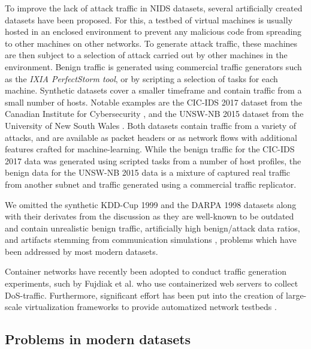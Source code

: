 \documentclass[sigconf]{acmart}
\begin{document}
To improve the lack of attack traffic in NIDS datasets, several artificially created datasets have been proposed. For this, a testbed of virtual machines is usually hosted in an enclosed environment to prevent any malicious code from spreading to other machines on other networks. To generate attack traffic, these machines are then subject to a selection of attack carried out by other machines in the environment. Benign traffic is generated using commercial traffic generators such as the \emph{IXIA PerfectStorm tool}, or by scripting a selection of tasks for each machine. Synthetic datasets cover a smaller timeframe and contain traffic from a small number of hosts. Notable examples are the CIC-IDS 2017 dataset from the Canadian Institute for Cybersecurity \cite{sharafaldin2018towards}, %
and the UNSW-NB 2015 dataset from the University of New South Wales \cite{moustafa_unsw-nb15:_2015}. Both datasets contain traffic from a variety of attacks, and are available as packet headers or as network flows with additional features crafted for machine-learning. While the benign traffic for the CIC-IDS 2017 data was generated using scripted tasks from a number of host profiles, the benign data for the UNSW-NB 2015 data is a mixture of captured real traffic from another subnet and traffic generated using a commercial traffic replicator. 


We omitted the synthetic KDD-Cup 1999 and the DARPA 1998 datasets along with their derivates from the discussion as they are well-known to be outdated and contain unrealistic benign traffic, artificially high benign/attack data ratios, and artifacts stemming from communication simulations \cite{tavallaee2009detailed,mchugh2000testing}, problems which have been addressed by most modern datasets.

Container networks have recently been adopted to conduct traffic generation experiments, such by Fujdiak et al. \cite{fujdiak2018ip} who use containerized web servers to collect DoS-traffic. Furthermore, significant effort has been put into the creation of large-scale virtualization frameworks to provide automatized network testbeds \cite{crussell2015minimega, badiger2018violet}.




\subsection{Problems in modern datasets}\label{Sec:problems}
\end{document}
